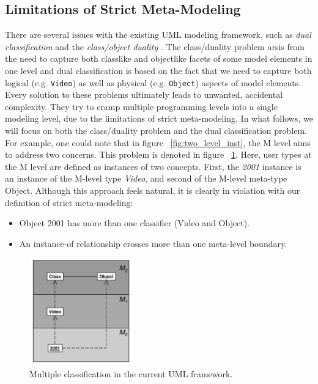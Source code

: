 \subsection{Limitations of Strict Meta-Modeling}

There are several issues with the existing UML modeling framework, such as \textit{dual classification} and the \textit{class/object duality} \cite{RearchitectingUML}. The class/duality problem arsis from the need to capture both classlike and objectlike facets of some model elements in one level and dual classification is based on the fact that we need to capture both logical (e.g. \texttt{Video}) as well as physical (e.g. \texttt{Object}) aspects of model elements. Every solution to these problems ultimately leads to unwanted, accidental complexity. They try to cramp multiple programming levels into a single modeling level, due to the limitations of strict meta-modeling. In what follows, we will focus on both the class/duality problem and the dual classification problem. For example, one could note that in figure ~\ref{fig:two_level_inst}, the M level aims to address two concerns. This problem is denoted in figure ~\ref{fig:multiple_class_mm}. Here, user types at the M level are defined as instances of two concepts. First, the \textit{2001} instance is an instance of the M-level type \textit{Video}, and second of the M-level meta-type Object. Although this approach feels natural, it is clearly in violation with our definition of strict meta-modeling:

\begin{itemize}
\item{Object 2001 has more than one classifier (Video and Object).}
\item{An instance-of relationship crosses more than one meta-level boundary.}
\end{itemize}

\begin{figure}[h!]
\centering
\includegraphics[width=0.4\textwidth]{images/chap2_multiple_class_uml.png}
\caption{Multiple classification in the current UML framework.}
\label{fig:multiple_class_mm}
\end{figure}

